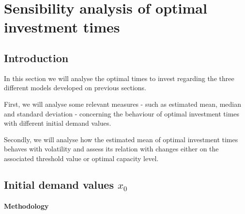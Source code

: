 \chapter{Sensibility analysis of optimal investment times}
\label{chapter:stoptime}



\section{Introduction}
\label{section:stoptime_intro}

In this section we will analyse the optimal times to invest regarding the three different models developed on previous sections.

First, we will analyse some relevant measures - such as estimated mean, median and standard deviation - concerning the behaviour of optimal investment times with different initial demand values.

Secondly, we will analyse how the estimated mean of optimal investment times behaves with volatility and assess its relation with changes  either on the associated threshold value or optimal capacity level.

\section{Initial demand values $x_0$}
\label{section:x0}

\subsubsection{Methodology}










































